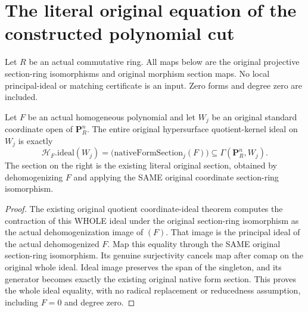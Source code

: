 \section{The literal original equation of the constructed polynomial cut}
Let $R$ be an actual commutative ring. All maps below are the original
projective section-ring isomorphisms and original morphism section maps.
No local principal-ideal or matching certificate is an input. Zero forms
and degree zero are included.

\begin{lemma}
\label{lem:pl-gauss-original-hypersurface-principal-chart-ideal}
\leanok
Let $F$ be an actual homogeneous polynomial and let $W_j$ be an
original standard coordinate open of $\mathbf P^n_R$. The entire
original hypersurface quotient-kernel ideal on $W_j$ is exactly
\[
 \mathcal H_F.\mathrm{ideal}(W_j)
   =\bigl(\mathrm{nativeFormSection}_j(F)\bigr)
      \subseteq\Gamma(\mathbf P^n_R,W_j).
\]
The section on the right is the existing literal original section,
obtained by dehomogenizing $F$ and applying the SAME original coordinate
section-ring isomorphism.
\end{lemma}
\begin{proof}
The existing original quotient coordinate-ideal theorem computes the
contraction of this WHOLE ideal under the original section-ring
isomorphism as the actual dehomogenization image of $(F)$. That image
is the principal ideal of the actual dehomogenized $F$. Map this equality
through the SAME original section-ring isomorphism. Its genuine
surjectivity cancels map after comap on the original whole ideal. Ideal
image preserves the span of the singleton, and its generator becomes
exactly the existing original native form section. This proves the
whole ideal equality, with no radical replacement or reducedness
assumption, including $F=0$ and degree zero.
\end{proof}

